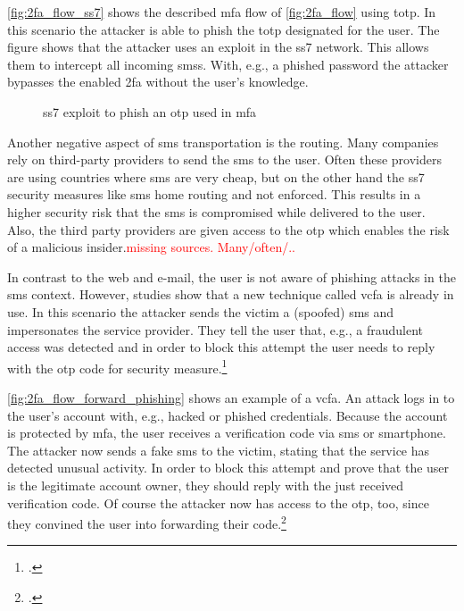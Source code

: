\autoref{fig:2fa_flow_ss7} shows the described \gls{mfa} flow of \autoref{fig:2fa_flow} using \gls{totp}. In this scenario the attacker is able to phish the \gls{totp} designated for the user. The figure shows that the attacker uses an exploit in the \gls{ss7} network. This allows them to intercept all incoming \glspl{sms}. With, e.g., a phished password the attacker bypasses the enabled \gls{2fa} without the user's knowledge.

\begin{figure}[hbt]
	\centering
	
	\caption[\gls{ss7} exploit to phish an \gls{otp} used in \gls{mfa}]{\gls{ss7} exploit to phish an \gls{otp} used in \gls{mfa}\footnotemark}
	\label{fig:2fa_flow_ss7}
\end{figure}

Another negative aspect of \gls{sms} transportation is the routing. Many companies rely on third-party providers to send the \gls{sms} to the user. Often these providers are using countries where \gls{sms} are very cheap, but on the other hand the \gls{ss7} security measures like \gls{sms} home routing and not enforced. This results in a higher security risk that the \gls{sms} is compromised while delivered to the user. Also, the third party providers are given access to the \gls{otp} which enables the risk of a malicious insider.\textcolor{red}{missing sources. Many/often/..}

In contrast to the web and e-mail, the user is not aware of phishing attacks in the \gls{sms} context. However, studies show that a new technique called \gls{vcfa} is already in use. In this scenario the attacker sends the victim a (spoofed) \gls{sms} and impersonates the service provider. They tell the user that, e.g., a fraudulent access was detected and in order to block this attempt the user needs to reply with the \gls{otp} code for security measure.\footcites[See][6--7]{JAKOBSSON20186}[See][4--5]{SIADATI201714}

\newpage

\autoref{fig:2fa_flow_forward_phishing} shows an example of a \gls{vcfa}. An attack logs in to the user's account with, e.g., hacked or phished credentials. Because the account is protected by \gls{mfa}, the user receives a verification code via \gls{sms} or smartphone. The attacker now sends a fake \gls{sms} to the victim, stating that the service has detected unusual activity. In order to block this attempt and prove that the user is the legitimate account owner, they should reply with the just received verification code. Of course the attacker now has access to the \gls{otp}, too, since they convined the user into forwarding their code.\footcites[See][66]{10.1007/978-3-319-29938-9_5}

